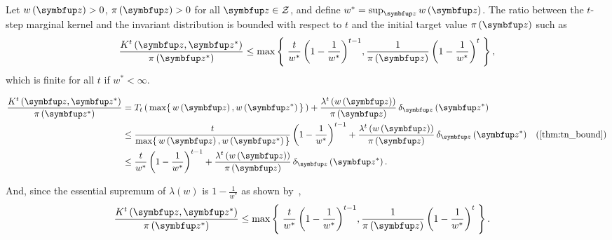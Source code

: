 
\begin{proposition}\label{thm:imh_tail}
  Let \(w\left(\vz\right) > 0\), \(\pi\left(\vz\right) > 0\) for all \(\vz \in \mathcal{Z}\), and define \(w^* = \sup_{\vz} w\left(\vz\right)\).
  The ratio between the \(t\)-step marginal kernel and the invariant distribution is bounded with respect to \(t\) and the initial target value \(\pi\left(\vz\right)\) such as
  {\small
  \[
  \frac{K^t\left(\vz, \vz^*\right)}{\pi\left(\vz^*\right)} \leq
    \max\left\{\;
    \frac{t}{w^*} \, {\left(1 - \frac{1}{w^*}\right)}^{t-1},
    \frac{1}{\pi\left(\vz\right)} \, {\left(1-\frac{1}{w^*}\right)}^t
    \;\right\},
  \]
  }
  which is finite for all \(t\) if \(w^* < \infty\).
\end{proposition}
\begin{proofEnd}
  \begin{align}
    \frac{K^t\left(\vz, \vz^*\right)}{\pi\left(\vz^*\right)}
    &= T_t\left(\,\max\{\, w\left(\vz\right), w\left(\vz^*\right)\,\}\,\right)
    + \frac{\lambda^t\left(w\left(\vz\right)\right)}{\pi\left(\vz\right)} \, \delta_{\vz}\left(\vz^*\right)
    \\
    &\leq
    \frac{t}{\max\{\, w\left(\vz\right), w\left(\vz^*\right)\,\}} \, {\left(1 - \frac{1}{w^*}\right)}^{t-1} + \frac{\lambda^t\left(w\left(\vz\right)\right)}{\pi\left(\vz\right)} \, \delta_{\vz}\left(\vz^*\right)
    &\text{(\cref{thm:tn_bound})}
    \\
    &\leq
    \frac{t}{w^*} \, {\left(1 - \frac{1}{w^*}\right)}^{t-1} + \frac{\lambda^t\left(w\left(\vz\right)\right)}{\pi\left(\vz\right)} \, \delta_{\vz}\left(\vz^*\right).
  \end{align}

  And, since the essential supremum of \(\lambda\left(w\right)\) is \(1 - \frac{1}{w^*}\) as shown by~\citet{Smith96exacttransition},
  \begin{align}
    \frac{K^t\left(\vz, \vz^*\right)}{\pi\left(\vz^*\right)}
    &\leq
    \max\left\{\;
    \frac{t}{w^*} \, {\left(1 - \frac{1}{w^*}\right)}^{t-1},
    \frac{1}{\pi\left(\vz\right)} \, {\left(1-\frac{1}{w^*}\right)}^t
    \;\right\}.
  \end{align}
\end{proofEnd}

